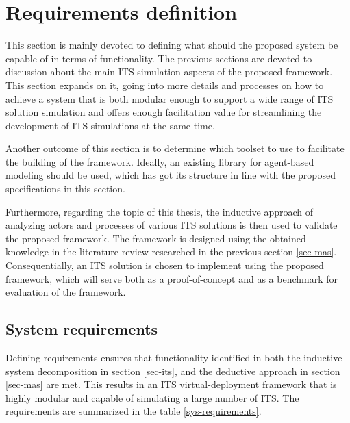 \documentclass[0main.tex]{subfiles}
\begin{document}
\section{Requirements definition}\label{sec-requirements}

This section is mainly devoted to defining what should the proposed system be capable of in
terms of functionality. The previous sections are devoted to discussion about the main ITS
simulation aspects of the proposed framework. This section expands on it, going into more
details and processes on how to achieve a system that is both modular enough to support a wide
range of ITS solution simulation and offers enough facilitation value for streamlining the
development of ITS simulations at the same time. 

Another outcome of this section is to determine which toolset to use to facilitate the building of 
the framework. Ideally, an existing library for agent-based modeling should be used, which has got 
its structure in line with the proposed specifications in this section.

Furthermore, regarding the topic of this thesis, the inductive approach of analyzing actors and
processes of various ITS solutions is then used to validate the proposed framework. The
framework is designed using the obtained knowledge in the literature review researched in the
previous section \ref{sec-mas}. Consequentially, an ITS solution is chosen to implement
using the proposed framework, which will serve both as a proof-of-concept and as a benchmark
for evaluation of the framework.  

\subsection{System requirements}

Defining requirements ensures that functionality identified in both the inductive system
decomposition in section \ref{sec-its}, and the deductive approach in section \ref{sec-mas}
are met. This results in an ITS virtual-deployment framework that is highly modular and
capable of simulating a large number of ITS. The requirements are summarized in the table
\ref{sys-requirements}.
\end{document}
